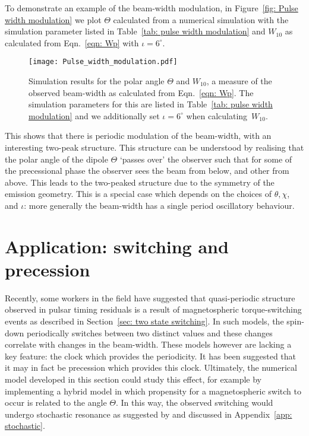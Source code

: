 \documentclass[../full_thesis/full_thesis.tex]{subfiles}
\newcommand{\thisdir}{../inertial_frame}
\begin{document}
\begin{table}[htb]
\centering

\caption{Simulation parameters for the beam-width modulations plotted in
Figure~\ref{fig: Pulse width modulation}.}
\label{tab: pulse width modulation}
\end{table}
To demonstrate an example of the beam-width modulation, in Figure~\ref{fig: Pulse width
modulation} we plot $\Theta$ calculated from a numerical simulation with the
simulation parameter listed in Table~\ref{tab: pulse width modulation} and
$W_{10}$ as calculated from Eqn.~\eqref{eqn: Wp} with $\iota=6^{\circ}$.
\begin{figure}[ht]
\centering
\texttt{[image: Pulse\_width\_modulation.pdf]}
\caption{Simulation results for the polar angle $\Theta$ and $W_{10}$, a
measure of the observed beam-width as calculated from Eqn.~\eqref{eqn: Wp}.
The simulation parameters for this are listed in Table~\ref{tab: pulse width modulation}
and we additionally set $\iota=6^{\circ}$ when calculating~$W_{10}$.}
\label{fig: Pulse width modulation}
\end{figure}
This shows that there is periodic modulation of the beam-width, with an
interesting two-peak structure. This structure can be understood by realising
that the polar angle of the dipole $\Theta$ `passes over' the observer such
that for some of the precessional phase the observer sees the beam from below,
and other from above. This leads to the two-peaked structure due to the
symmetry of the emission geometry. This is a special case which depends on
the choices of $\theta, \chi$, and $\iota$: more generally the beam-width has
a single period oscillatory behaviour.


\section{Application: switching and precession}
\label{sec: application switching and precession}

Recently, some workers in the field \citep{Lyne2010, Perera2015} have suggested
that quasi-periodic structure observed in pulsar timing residuals is a result
of magnetospheric torque-switching events as described in Section~\ref{sec: two
state switching}. In such models, the spin-down periodically switches between
two distinct values and these changes correlate with changes in the beam-width.
These models however are lacking a key feature: the clock which provides the
periodicity. It has been suggested \citep{Jones2012} that it may in fact be
precession which provides this clock. Ultimately, the numerical model developed
in this section could study this effect, for example by implementing a hybrid
model in which propensity for a magnetospheric switch to occur is related to
the angle $\Theta$. In this way, the observed switching would undergo
stochastic resonance as suggested by \citet{Cordes2013} and discussed in Appendix~\ref{app:
stochastic}.
\end{document}
